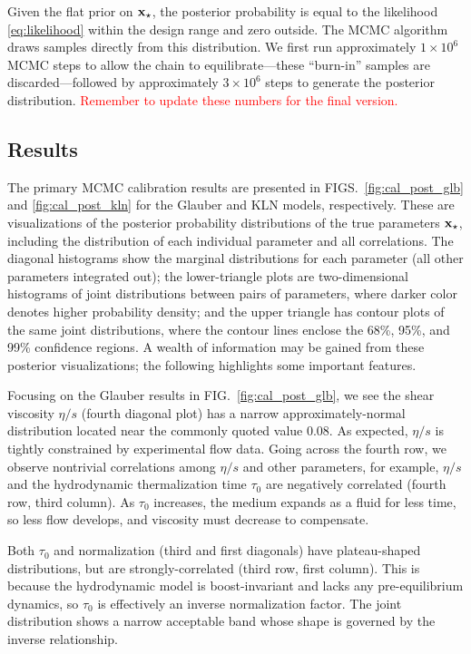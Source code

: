 \documentclass[aps,prc,reprint,amsmath]{revtex4-1}
\newcommand{\todo}[1]{\textcolor{red}{#1}}
\begin{document}
Given the flat prior on $\mathbf x_\star$, the posterior probability is equal to the likelihood \eqref{eq:likelihood} within the design range and zero outside.
The MCMC algorithm draws samples directly from this distribution.
We first run approximately $1 \times 10^6$ MCMC steps to allow the chain to equilibrate---these ``burn-in'' samples are discarded---followed by approximately $3 \times 10^6$ steps to generate the posterior distribution.
\todo{Remember to update these numbers for the final version.}

\subsection{Results}

The primary MCMC calibration results are presented in FIGS.~\ref{fig:cal_post_glb} and \ref{fig:cal_post_kln} for the Glauber and KLN models, respectively.
These are visualizations of the posterior probability distributions of the true parameters $\mathbf x_\star$, including the distribution of each individual parameter and all correlations.
The diagonal histograms show the marginal distributions for each parameter (all other parameters integrated out);
the lower-triangle plots are two-dimensional histograms of joint distributions between pairs of parameters, where darker color denotes higher probability density;
and the upper triangle has contour plots of the same joint distributions, where the contour lines enclose the 68\%, 95\%, and 99\% confidence regions.
A wealth of information may be gained from these posterior visualizations; the following highlights some important features.

Focusing on the Glauber results in FIG.~\ref{fig:cal_post_glb}, we see the shear viscosity $\eta/s$ (fourth diagonal plot) has a narrow approximately-normal distribution located near the commonly quoted value 0.08.
As expected, $\eta/s$ is tightly constrained by experimental flow data.
Going across the fourth row, we observe nontrivial correlations among $\eta/s$ and other parameters, for example, $\eta/s$ and the hydrodynamic thermalization time $\tau_0$ are negatively correlated (fourth row, third column).
As $\tau_0$ increases, the medium expands as a fluid for less time, so less flow develops, and viscosity must decrease to compensate.

Both $\tau_0$ and normalization (third and first diagonals) have plateau-shaped distributions, but are strongly-correlated (third row, first column).
This is because the hydrodynamic model is boost-invariant and lacks any pre-equilibrium dynamics, so $\tau_0$ is effectively an inverse normalization factor.
The joint distribution shows a narrow acceptable band whose shape is governed by the inverse relationship.
\end{document}

